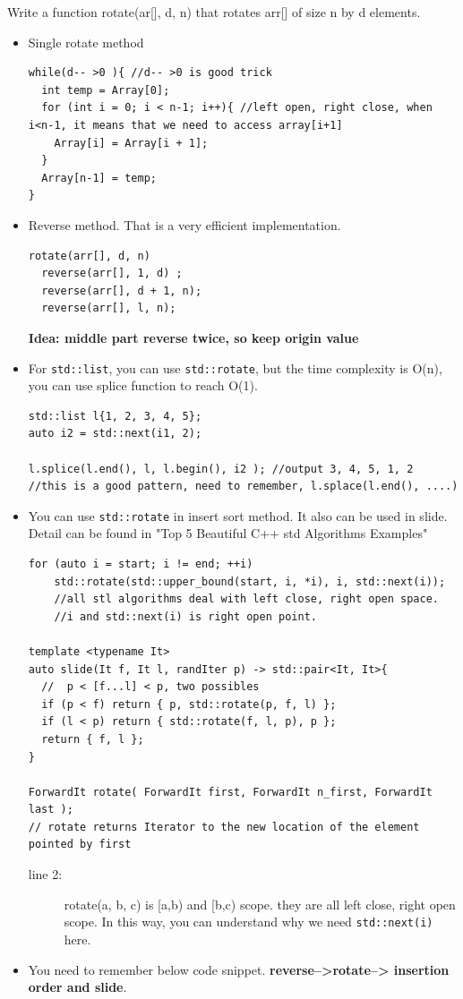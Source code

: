 \documentclass[a4paper,11pt,twoside]{book}
\begin{document}
	\par  Write a function rotate(ar[], d, n) that rotates arr[] of size n by d elements.
\begin{itemize}
	
	\item Single rotate method
\begin{lstlisting}[breaklines]
while(d-- >0 ){ //d-- >0 is good trick
  int temp = Array[0];
  for (int i = 0; i < n-1; i++){ //left open, right close, when i<n-1, it means that we need to access array[i+1]
    Array[i] = Array[i + 1];
  }
  Array[n-1] = temp;
}
\end{lstlisting}

	\item Reverse method. That is a very efficient implementation.
\begin{lstlisting}[breaklines]
rotate(arr[], d, n)
  reverse(arr[], 1, d) ;
  reverse(arr[], d + 1, n);
  reverse(arr[], l, n);
\end{lstlisting}
\textbf{Idea: middle part reverse twice, so keep origin value}

	\item For \texttt{std::list}, you can use \texttt{std::rotate}, but the time complexity is O(n), you can use splice function to reach O(1).  
\begin{lstlisting}
std::list l{1, 2, 3, 4, 5};
auto i2 = std::next(i1, 2);

l.splice(l.end(), l, l.begin(), i2 ); //output 3, 4, 5, 1, 2
//this is a good pattern, need to remember, l.splace(l.end(), ....)
\end{lstlisting}


	\item You can use \texttt{std::rotate} in insert sort method. It also can be used in slide. Detail can be found in "Top 5 Beautiful C++ std Algorithms Examples"
\begin{lstlisting}[breaklines, basicstyle=\scriptsize]
for (auto i = start; i != end; ++i)
	std::rotate(std::upper_bound(start, i, *i), i, std::next(i));  
	//all stl algorithms deal with left close, right open space. 
	//i and std::next(i) is right open point.

template <typename It> 
auto slide(It f, It l, randIter p) -> std::pair<It, It>{
  //  p < [f...l] < p, two possibles 
  if (p < f) return { p, std::rotate(p, f, l) };
  if (l < p) return { std::rotate(f, l, p), p };
  return { f, l };
}

ForwardIt rotate( ForwardIt first, ForwardIt n_first, ForwardIt last );
// rotate returns Iterator to the new location of the element pointed by first
\end{lstlisting}
\begin{description}
	\item[line 2:] rotate(a, b, c) is [a,b) and [b,c) scope. they are all left close, right open scope. In this way, you can understand why we need \texttt{std::next(i)} here.
\end{description}

	\item You need to remember below code snippet. \textbf{reverse-->rotate--> insertion order and slide}. 

\end{itemize}
\end{document}
